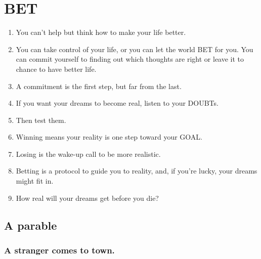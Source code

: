 \documentclass[
]{book}
\providecommand{\tightlist}{%
  \setlength{\itemsep}{0pt}\setlength{\parskip}{0pt}}
\begin{document}
\hypertarget{bet}{%
\chapter{BET}\label{bet}}

\begin{enumerate}
\def\labelenumi{\arabic{enumi}.}
\tightlist
\item
  You can't help but think how to make your life better.
\item
  You can take control of your life, or you can let the world BET for you.
  You can commit yourself to finding out which thoughts are right or
  leave it to chance to have better life.
\item
  A commitment is the first step, but far from the last.
\item
  If you want your dreams to become real, listen to your DOUBTs.
\item
  Then test them.
\item
  Winning means your reality is one step toward your GOAL.
\item
  Losing is the wake-up call to be more realistic.
\item
  Betting is a protocol to guide you to reality, and, if you're lucky, your
  dreams might fit in.
\item
  How real will your dreams get before you die?
\end{enumerate}

\hypertarget{a-parable}{%
\section{A parable}\label{a-parable}}

\hypertarget{a-stranger-comes-to-town.}{%
\subsection{A stranger comes to town.}\label{a-stranger-comes-to-town.}}
\end{document}
